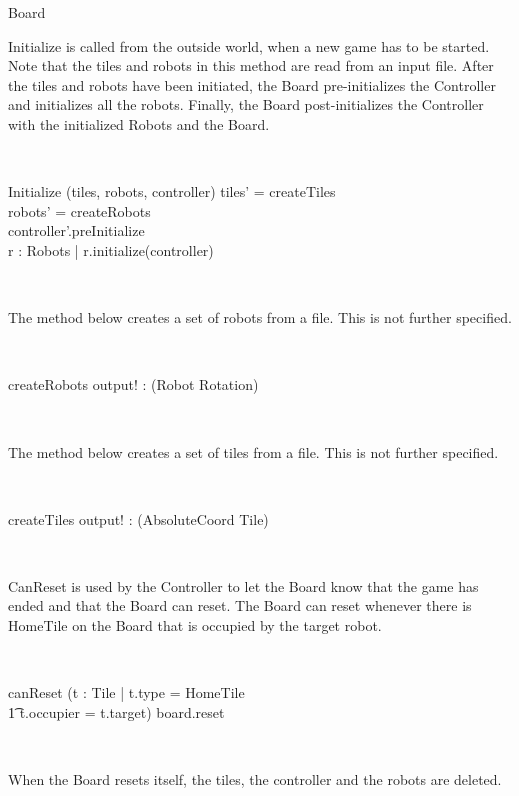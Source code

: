 \begin{class}{Board}
\begin{classcom}
Initialize is called from the outside world, when a new game has to be started. Note that the tiles and robots in this method are read from an input file. After the tiles and robots have been initiated, the Board pre-initializes the Controller and initializes all the robots. Finally, the Board post-initializes the Controller with the initialized Robots and the Board.
\end{classcom} \\
\begin{schema}{Initialize}
\Delta (tiles, robots, controller)
\where
tiles' = createTiles \\
robots' = createRobots \\
controller'.preInitialize \\
\forall r : \dom Robots | r.initialize(controller)
\end{schema} \\
\begin{classcom}
The method below creates a set of robots from a file. This is not further specified.
\end{classcom} \\
\begin{schema}{createRobots}
output! : \power (Robot \fun Rotation)
\end{schema} \\
\begin{classcom}
The method below creates a set of tiles from a file. This is not further specified.
\end{classcom} \\
\begin{schema}{createTiles}
output! : \power (AbsoluteCoord \fun Tile)
\end{schema} \\
\begin{classcom}
CanReset is used by the Controller to let the Board know that the game has ended and that the Board can reset. The Board can reset whenever there is HomeTile on the Board that is occupied by the target robot.
\end{classcom} \\
\begin{schema}{canReset}
\where
(\exists t : Tile | t.type = HomeTile \\ \t1
t.occupier = t.target) \Rightarrow board.reset
\end{schema} \\
\begin{classcom}
When the Board resets itself, the tiles, the controller and the robots are deleted.

\end{classcom}
\end{class}
